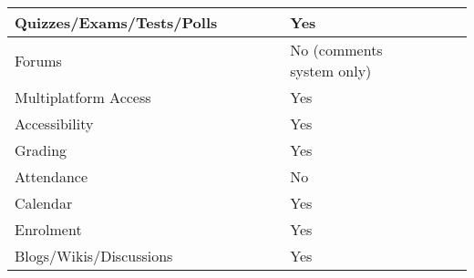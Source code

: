 \begin{table}[ht]
{\begin{tabular}{llllllll}
    \multicolumn{1}{|l|}{Quizzes/Exams/Tests/Polls}   & \multicolumn{1}{l|}{} & \multicolumn{1}{l|}{} & \multicolumn{1}{l|}{} & \multicolumn{1}{l|}{} & \multicolumn{1}{l|}{Yes}                       & \multicolumn{1}{l|}{} & \multicolumn{1}{l|}{} \\ \hline
    \multicolumn{1}{|l|}{Forums}                      & \multicolumn{1}{l|}{} & \multicolumn{1}{l|}{} & \multicolumn{1}{l|}{} & \multicolumn{1}{l|}{} & \multicolumn{1}{l|}{No (comments system only)} & \multicolumn{1}{l|}{} & \multicolumn{1}{l|}{} \\ \hline
    \multicolumn{1}{|l|}{Multiplatform Access}        & \multicolumn{1}{l|}{} & \multicolumn{1}{l|}{} & \multicolumn{1}{l|}{} & \multicolumn{1}{l|}{} & \multicolumn{1}{l|}{Yes}                       & \multicolumn{1}{l|}{} & \multicolumn{1}{l|}{} \\ \hline
    \multicolumn{1}{|l|}{Accessibility}               & \multicolumn{1}{l|}{} & \multicolumn{1}{l|}{} & \multicolumn{1}{l|}{} & \multicolumn{1}{l|}{} & \multicolumn{1}{l|}{Yes}                       & \multicolumn{1}{l|}{} & \multicolumn{1}{l|}{} \\ \hline
    \multicolumn{1}{|l|}{Grading}                     & \multicolumn{1}{l|}{} & \multicolumn{1}{l|}{} & \multicolumn{1}{l|}{} & \multicolumn{1}{l|}{} & \multicolumn{1}{l|}{Yes}                       & \multicolumn{1}{l|}{} & \multicolumn{1}{l|}{} \\ \hline
    \multicolumn{1}{|l|}{Attendance}                  & \multicolumn{1}{l|}{} & \multicolumn{1}{l|}{} & \multicolumn{1}{l|}{} & \multicolumn{1}{l|}{} & \multicolumn{1}{l|}{No}                        & \multicolumn{1}{l|}{} & \multicolumn{1}{l|}{} \\ \hline
    \multicolumn{1}{|l|}{Calendar}                    & \multicolumn{1}{l|}{} & \multicolumn{1}{l|}{} & \multicolumn{1}{l|}{} & \multicolumn{1}{l|}{} & \multicolumn{1}{l|}{Yes}                       & \multicolumn{1}{l|}{} & \multicolumn{1}{l|}{} \\ \hline
    \multicolumn{1}{|l|}{Enrolment}                   & \multicolumn{1}{l|}{} & \multicolumn{1}{l|}{} & \multicolumn{1}{l|}{} & \multicolumn{1}{l|}{} & \multicolumn{1}{l|}{Yes}                       & \multicolumn{1}{l|}{} & \multicolumn{1}{l|}{} \\ \hline
    \multicolumn{1}{|l|}{Blogs/Wikis/Discussions}     & \multicolumn{1}{l|}{} & \multicolumn{1}{l|}{} & \multicolumn{1}{l|}{} & \multicolumn{1}{l|}{} & \multicolumn{1}{l|}{Yes}                       & \multicolumn{1}{l|}{} & \multicolumn{1}{l|}{} \\ \hline

\end{tabular}}
\end{table}

